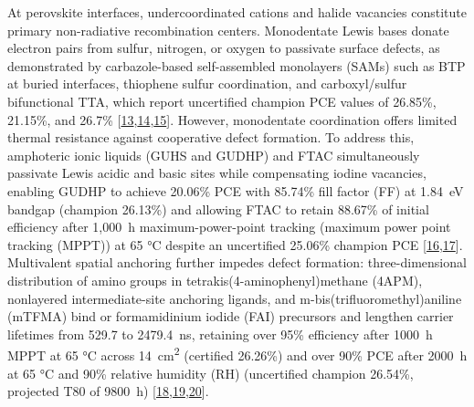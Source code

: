\documentclass[
  11pt,
]{article}
\begin{document}
At perovskite interfaces, undercoordinated  cations and halide
vacancies constitute primary non-radiative recombination centers.
Monodentate Lewis bases donate electron pairs from sulfur, nitrogen, or
oxygen to passivate surface  defects, as demonstrated by
carbazole-based self-assembled monolayers (SAMs) such as BTP at buried
interfaces, thiophene sulfur coordination, and carboxyl/sulfur
bifunctional TTA, which report uncertified champion PCE values of
26.85\%, 21.15\%, and 26.7\%
{[}\href{https://doi.org/10.1002/anie.1864800}{13},\href{https://doi.org/10.1021/acsami.6c05331}{14},\href{https://doi.org/10.1002/adma.73950}{15}{]}.
However, monodentate coordination offers limited thermal resistance
against cooperative defect formation. To address this, amphoteric ionic
liquids (GUHS and GUDHP) and FTAC simultaneously passivate Lewis acidic
and basic sites while compensating iodine vacancies, enabling GUDHP to
achieve 20.06\% PCE with 85.74\% fill factor (FF) at
\qty{1.84}{\electronvolt} bandgap (champion 26.13\%) and allowing FTAC
to retain 88.67\% of initial efficiency after 1,\qty{000}{\hour}
maximum-power-point tracking (maximum power point tracking (MPPT)) at 65
°C despite an uncertified 25.06\% champion PCE
{[}\href{https://doi.org/10.1002/adfm.77378}{16},\href{https://doi.org/10.20517/energymater.2026.102}{17}{]}.
Multivalent spatial anchoring further impedes defect formation:
three-dimensional distribution of amino groups in
tetrakis(4-aminophenyl)methane (4APM), nonlayered intermediate-site
anchoring ligands, and m-bis(trifluoromethyl)aniline (mTFMA) bind
 or formamidinium iodide (FAI) precursors and lengthen carrier
lifetimes from 529.7 to \qty{2479.4}{\nano\second}, retaining over 95\%
efficiency after \qty{1000}{\hour} MPPT at 65 °C across
\qty{14}{\centi\meter\squared} (certified 26.26\%) and over 90\% PCE
after \qty{2000}{\hour} at 65 °C and 90\% relative humidity (RH)
(uncertified champion 26.54\%, projected T80 of \qty{9800}{\hour})
{[}\href{https://doi.org/10.1038/s41467-026-75990-x}{18},\href{https://doi.org/10.1002/adma.74243}{19},\href{https://doi.org/10.1021/acsaem.6c01560}{20}{]}.
\end{document}
